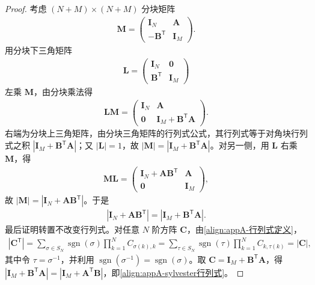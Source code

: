 \documentclass[../main.tex]{subfiles}
\begin{document}
\begin{proof}
考虑 $(N+M)\times(N+M)$ 分块矩阵
\begin{align*}
 \bm{M}=\begin{pmatrix}\bm{I}_{N}&\bm{A}\\-\bm{B}^{\mathsf{T}}&\bm{I}_{M}\end{pmatrix}.
\end{align*}
用分块下三角矩阵
\begin{align*}
 \bm{L}=\begin{pmatrix}\bm{I}_{N}&\bm{0}\\\bm{B}^{\mathsf{T}}&\bm{I}_{M}\end{pmatrix}
\end{align*}
左乘 $\bm{M}$，由分块乘法得
\begin{align*}
 \bm{L}\bm{M}=\begin{pmatrix}\bm{I}_{N}&\bm{A}\\\bm{0}&\bm{I}_{M}+\bm{B}^{\mathsf{T}}\bm{A}\end{pmatrix}.
\end{align*}
右端为分块上三角矩阵，由分块三角矩阵的行列式公式，其行列式等于对角块行列式之积 $|\bm{I}_{M}+\bm{B}^{\mathsf{T}}\bm{A}|$；又 $|\bm{L}|=1$，故 $|\bm{M}|=|\bm{I}_{M}+\bm{B}^{\mathsf{T}}\bm{A}|$。对另一侧，用 $\bm{L}$ 右乘 $\bm{M}$，得
\begin{align*}
 \bm{M}\bm{L}=\begin{pmatrix}\bm{I}_{N}+\bm{A}\bm{B}^{\mathsf{T}}&\bm{A}\\\bm{0}&\bm{I}_{M}\end{pmatrix},
\end{align*}
故 $|\bm{M}|=|\bm{I}_{N}+\bm{A}\bm{B}^{\mathsf{T}}|$。于是
\begin{align*}
 |\bm{I}_{N}+\bm{A}\bm{B}^{\mathsf{T}}|=|\bm{I}_{M}+\bm{B}^{\mathsf{T}}\bm{A}|.
\end{align*}
最后证明转置不改变行列式。对任意 $N$ 阶方阵 $\bm{C}$，由\eqref{align:appA-行列式定义}，
\begin{align*}
 |\bm{C}^{\mathsf{T}}|=\sum_{\sigma\in S_N}\operatorname{sgn}(\sigma)\prod_{k=1}^{N}C_{\sigma(k),k}
 =\sum_{\tau\in S_N}\operatorname{sgn}(\tau)\prod_{k=1}^{N}C_{k,\tau(k)}=|\bm{C}|,
\end{align*}
其中令 $\tau=\sigma^{-1}$，并利用 $\operatorname{sgn}(\sigma^{-1})=\operatorname{sgn}(\sigma)$。取 $\bm{C}=\bm{I}_{M}+\bm{B}^{\mathsf{T}}\bm{A}$，得 $|\bm{I}_{M}+\bm{B}^{\mathsf{T}}\bm{A}|=|\bm{I}_{M}+\bm{A}^{\mathsf{T}}\bm{B}|$，即\eqref{align:appA-sylvester行列式}。
\end{proof}
\end{document}
